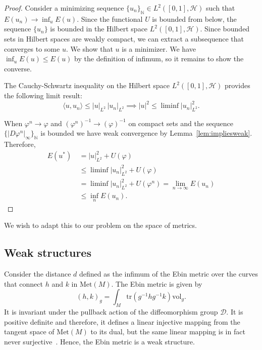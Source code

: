 \documentclass{article}
\theoremstyle{plain}
\theoremstyle{definition}
\numberwithin{equation}{section}
\newcommand{\N}{\ensuremath{\mathbb{N}}}
\newcommand{\Met}{\ensuremath{\mathrm{Met}}}
\newcommand{\Vol}{\ensuremath{\mathrm{vol}}}
\newcommand{\tr}{\ensuremath{\mathrm{tr}}}
\newcommand{\cD}{\ensuremath{\mathcal{D}}}
\begin{document}
\begin{proof}
	Consider a minimizing sequence $\{u_n\}_\N \in L^2([0,1],\mathcal{H})$ such that $E(u_n)\to \inf_u E(u)$. Since the functional $U$ is bounded from below, the sequence $\{u_n\}$ is bounded in the Hilbert space $L^2([0,1],\mathcal{H})$. Since bounded sets in Hilbert spaces are weakly compact, we can extract a subsequence that converges to some $u$. We show that $u$ is a minimizer. We have $\inf_u E(u)\leq E(u)$ by the definition of infimum, so it remains to show the converse.
	
	The Cauchy-Schwartz inequality on the Hilbert space $L^2([0,1],\mathcal{H})$ provides the following limit result:
	\[
	\langle u,u_n\rangle\leq |u|_{L^2}\,|u_n|_{L^2} \implies |u|^2\leq \liminf |u_n|^2_{L^2}.
	\]
	 
	When $\varphi^n\to \varphi$ and $(\varphi^n)^{-1}\to (\varphi)^{-1}$ on compact sets and the sequence $\{|D\varphi^n|_\infty\}_\N$ is bounded we have weak convergence by Lemma~\ref{lem:impliesweak}. 
	Therefore,
	\begin{align*}
	E(u^*) \ &= |u|^2_{L^2} + U(\varphi)\\
	&\leq \liminf |u_n|^2_{L^2} + U(\varphi)\\
	&= \liminf |u_n|^2_{L^2} + U(\varphi^n) = \lim_{n\to\infty} E(u_n)\\
	&\leq \inf_n E(u_n).
	\end{align*} 
\end{proof}

We wish to adapt this to our problem on the space of metrics.

\subsection*{Weak structures}
Consider the distance $d$ defined as the infimum of the Ebin metric over the curves that connect $h$ and $k$ in $\Met(M)$. The Ebin metric is given by
\[
(h,k)_g = \int_M\tr(g^{-1}hg^{-1}k)\Vol_g.
\]
It is invariant under the pullback action of the diffeomorphism group $\cD$. It is positive definite and therefore, it defines a linear injective mapping from the tangent space of $\Met(M)$ to its dual, but the same linear mapping is in fact never surjective~\cite{clarke2009metric}. Hence, the Ebin metric is a weak structure.


	

\end{document}
